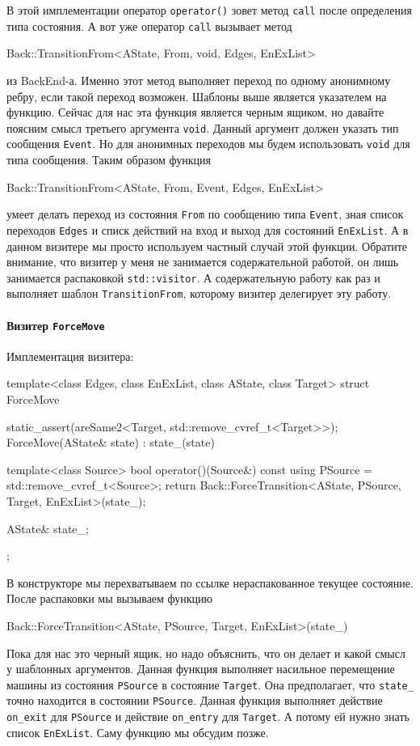 \documentclass{article}
\begin{document}
{В этой имплементации оператор \verb"operator()" зовет метод \verb"call" после определения типа состояния.
А вот уже оператор \verb"call" вызывает метод
\begin{cppcode}[\nonumbers]
Back::TransitionFrom<AState, From, void, Edges, EnExList>
\end{cppcode}
из BackEnd-а.
Именно этот метод выполняет переход по одному анонимному ребру, если такой переход возможен.
Шаблоны выше является указателем на функцию.
Сейчас для нас эта функция является черным ящиком, но давайте поясним смысл третьего аргумента \verb"void".
Данный аргумент должен указать тип сообщения \verb"Event".
Но для анонимных переходов мы будем использовать \verb"void" для типа сообщения.
Таким образом функция
\begin{cppcode}[\nonumbers]
Back::TransitionFrom<AState, From, Event, Edges, EnExList>
\end{cppcode}
умеет делать переход из состояния \verb"From" по сообщению типа \verb"Event", зная список переходов \verb"Edges" и списк действий на вход и выход для состояний \verb"EnExList".
А в данном визитере мы просто используем частный случай этой функции.
Обратите внимание, что визитер у меня не занимается содержательной работой, он лишь занимается распаковкой \verb"std::visitor".
А содержательную работу как раз и выполняет шаблон \verb"TransitionFrom", которому визитер делегирует эту работу.

\paragraph{Визитер \texttt{ForceMove}}

Имплементация визитера:
\begin{cppcode}
template<class Edges, class EnExList, class AState, class Target>
struct ForceMove {
  static_assert(areSame2<Target, std::remove_cvref_t<Target>>);
  ForceMove(AState& state) : state_(state) {
  }

  template<class Source>
  bool operator()(Source&) const {
    using PSource = std::remove_cvref_t<Source>;
    return Back::ForceTransition<AState, PSource, Target, EnExList>(state_);
  }

  AState& state_;
};
\end{cppcode}
В конструкторе мы перехватываем по ссылке нераспакованное текущее состояние.
После распаковки мы вызываем функцию
\begin{cppcode}[\nonumbers]
Back::ForceTransition<AState, PSource, Target, EnExList>(state_)
\end{cppcode}
Пока для нас это черный ящик, но надо объяснить, что он делает и какой смысл у шаблонных аргументов.
Данная функция выполняет насильное перемещение машины из состояния \verb"PSource" в состояние \verb"Target".
Она предполагает, что \verb"state_" точно находится в состоянии \verb"PSource".
Данная функция выполняет действие \verb"on_exit" для \verb"PSource" и действие \verb"on_entry" для \verb"Target".
А потому ей нужно знать список \verb"EnExList".
Саму функцию мы обсудим позже.

}
\end{document}
